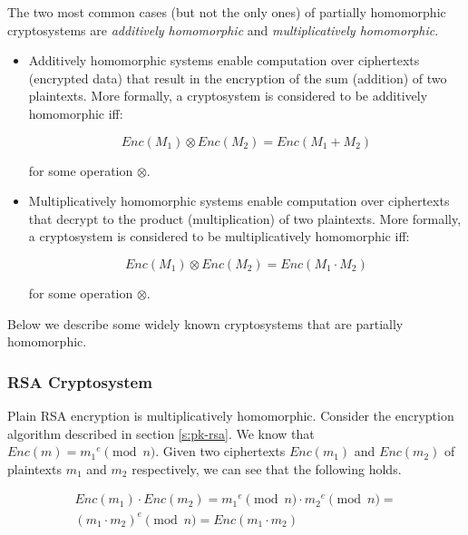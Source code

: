 The two most common cases (but not the only ones) of partially homomorphic cryptosystems are \textit{additively homomorphic} and \textit{multiplicatively homomorphic}.
\begin{itemize}
  \item Additively homomorphic systems enable computation over ciphertexts (encrypted data) that result in the encryption of the sum (addition) of two plaintexts. More formally, a cryptosystem is considered to be additively homomorphic iff:

  \begin{equation}\label{eq:additively-homomorphic}
    Enc(M_1) \otimes Enc(M_2) = Enc(M_1 + M_2)
  \end{equation}

  for some operation $ \otimes $.
  \item Multiplicatively homomorphic systems enable computation over ciphertexts that decrypt to the product (multiplication) of two plaintexts. More formally, a cryptosystem is considered to be multiplicatively homomorphic iff:

  \begin{equation}\label{eq:multiplicatively-homomorphic}
    Enc(M_1) \otimes Enc(M_2) = Enc(M_1 \cdot M_2)
  \end{equation}

  for some operation $ \otimes $.
\end{itemize}

Below we describe some widely known cryptosystems that are partially homomorphic.

\subsubsection{RSA Cryptosystem}\label{ss:rsa}
Plain RSA encryption is multiplicatively homomorphic. Consider the encryption algorithm described in section \ref{s:pk-rsa}. We know that $Enc(m) = {m_1}^{e}\pmod{n}$. Given two ciphertexts $Enc(m_1)$ and $Enc(m_2)$ of plaintexts $m_1$ and $m_2$ respectively,  we can see that the following holds.

\begin{equation}
  \label{eq:homomorphic-rsa}
  \begin{gathered}
Enc(m_1) \cdot Enc(m_2) = {m_1}^{e}\pmod{n} \cdot {m_2}^{e}\pmod{n} =\\ ({m_1}\cdot{m_2})^{e}\pmod{n} = Enc({m_1}\cdot{m_2})
  \end{gathered}
\end{equation}


